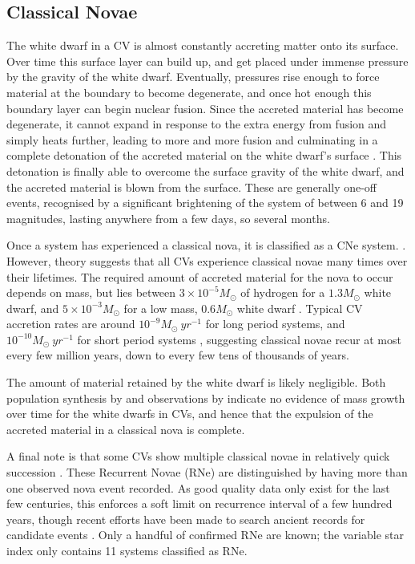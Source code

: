 \subsection{Classical Novae}
\label{sect:introduction:classical novae}

The white dwarf in a CV is almost constantly accreting matter onto its surface. Over time this surface layer can build up, and get placed under immense pressure by the gravity of the white dwarf. Eventually, pressures rise enough to force material at the boundary to become degenerate, and once hot enough this boundary layer can begin nuclear fusion. 
Since the accreted material has become degenerate, it cannot expand in response to the extra energy from fusion and simply heats further, leading to more and more fusion and culminating in a complete detonation of the accreted material on the white dwarf's surface \citep{warner1995}. This detonation is finally able to overcome the surface gravity of the white dwarf, and the accreted material is blown from the surface.
These are generally one-off events, recognised by a significant brightening of the system of between 6 and 19 magnitudes, lasting anywhere from a few days, so several months. 

Once a system has experienced a classical nova, it is classified as a CNe system. \citep{warner1995}. However, theory suggests that all CVs experience classical novae many times over their lifetimes. The required amount of accreted material for the nova to occur depends on mass, but lies between $3\times10^{-5} M_\odot$ of hydrogen for a $1.3 M_\odot$ white dwarf, and $5\times10^{-3} M_\odot$ for a low mass, $0.6 M_\odot$ white dwarf \citep{hellier2001}. Typical CV accretion rates are around $10^{-9} M_\odot\ yr^{-1}$ for long period systems, and $10^{-10} M_\odot\ yr^{-1}$ for short period systems \citep{hellier2001, Pala2021}, suggesting classical novae recur at most every few million years, down to every few tens of thousands of years.

The amount of material retained by the white dwarf is likely negligible. Both population synthesis by \citep{Wijnen2015} and observations by \citep{McAllister2017} indicate no evidence of mass growth over time for the white dwarfs in CVs, and hence that the expulsion of the accreted material in a classical nova is complete.

A final note is that some CVs show multiple classical novae in relatively quick succession \citep{schaeffer2010}. These Recurrent Novae (RNe) are distinguished by having more than one observed nova event recorded. As good quality data only exist for the last few centuries, this enforces a soft limit on recurrence interval of a few hundred years, though recent efforts have been made to search ancient records for candidate events \citep{hoffmann2022}. Only a handful of confirmed RNe are known; the variable star index \citep{Watson2006} only contains 11 systems classified as RNe.

